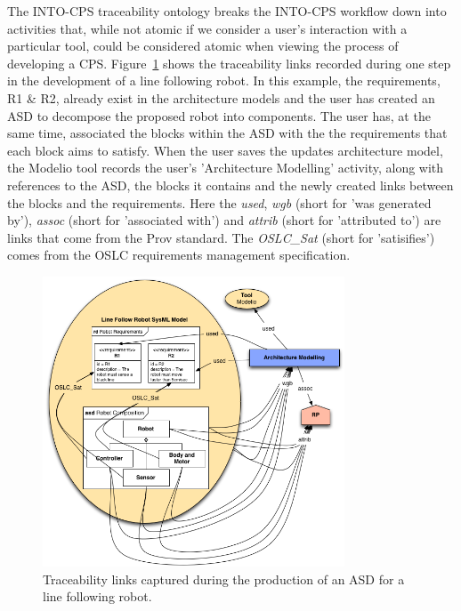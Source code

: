The INTO-CPS traceability ontology breaks the INTO-CPS workflow down into activities that, while not atomic if we consider a user's interaction with a particular tool, could be considered atomic when viewing the process of developing a CPS.  Figure~\ref{fig:traceability:step02} shows the traceability links recorded during one step in the development of a line following robot.  In this example, the requirements, R1 \& R2, already exist in the architecture models and the user has created an ASD to decompose the proposed robot into components.  The user has, at the same time, associated the blocks within the ASD with the the requirements that each block aims to satisfy.  When the user saves the updates architecture model, the Modelio tool records the user's 'Architecture Modelling' activity, along with references to the ASD, the blocks it contains and the newly created links between the blocks and the requirements.  Here the \emph{used}, \emph{wgb} (short for 'was generated by'), \emph{assoc} (short for 'associated with') and \emph{attrib} (short for 'attributed to') are links that come from the Prov standard.  The \emph{OSLC\_Sat} (short for 'satisifies') comes from the OSLC requirements management specification.


\begin{figure}[htbp]
	\centering
	\includegraphics[width=0.8\textwidth]{figures/Traceability/step02}
\caption{Traceability links captured during the production of an ASD for a line following robot.}\label{fig:traceability:step02}
\end{figure}

